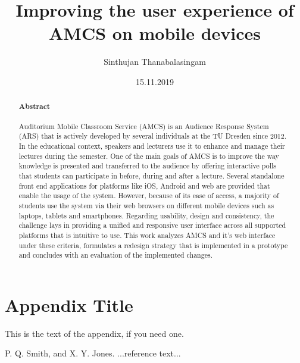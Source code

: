 \documentclass[ngerman]{tudscrreprt}
\begin{document}
	\date{15.11.2019}
	\author{Sinthujan Thanabalasingam}
	\title{Improving the user experience of AMCS on mobile devices}
	\maketitle
	
\begin{abstract}
\paragraph{Abstract}
Auditorium Mobile Classroom Service (AMCS) is an Audience Response System (ARS) that is actively developed by several individuals at the TU Dresden since 2012. In the educational context, speakers and lecturers use it to enhance and manage their lectures during the semester. One of the main goals of AMCS is to improve the way knowledge is presented and transferred to the audience by offering interactive polls that students can participate in before, during and after a lecture.
Several standalone front end applications for platforms like iOS, Android and web are provided that enable the usage of the system. However, because of its ease of access, a majority of students use the system via their web browsers on different mobile devices such as laptops, tablets and smartphones. 
Regarding usability, design and consistency, the challenge lays in providing a unified and responsive user interface across all supported platforms that is intuitive to use. This work analyzes AMCS and it's web interface under these criteria, formulates a redesign strategy that is implemented in a prototype and concludes with an evaluation of the implemented changes.
	
\end{abstract}









\appendix
\section{Appendix Title}

This is the text of the appendix, if you need one.






\begin{thebibliography}{}
	
	P. Q. Smith, and X. Y. Jones. ...reference text...
	
\end{thebibliography}
\end{document}
